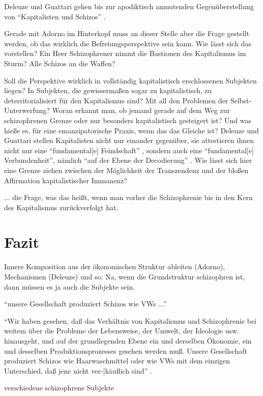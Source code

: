 \documentclass[12pt,
               DIV13,
               paper=a4,
               twoside=false,
               onehalfspacing,
               bibliography=totoc,
               toc=graduated,
               draft,
               ]{scrartcl}
\newcommand{\pc}[2]{\parencite[#1]{#2}}
\newcommand{\dg}{Deleuze und Guattari\xspace}
\begin{document}
\dg gehen bis zur apodiktisch anmutenden Gegenüberstellung von
"`Kapitalisten und Schizos"' \pc{328}{ao}.

Gerade mit Adorno im Hinterkopf muss an dieser Stelle aber die Frage
gestellt werden, ob das wirklich die Befreiungsperspektive sein kann.
Wie lässt sich das vorstellen? Ein Heer Schizophrener nimmt die
Bastionen des Kapitalismus im Sturm? Alle Schizos an die Waffen?

Soll die Perspektive wirklich in
vollständig kapitalistisch erschlossenen Subjekten liegen? In
Subjekten, die gewissermaßen sogar zu kapitalistisch, zu
deterritorialisiert für den Kapitalismus sind? Mit all den Problemen
der Selbst-Unterwerfung? Woran erkannt man, ob jemand gerade auf dem
Weg zur schizophrenen Grenze oder nur besonders kapitalistisch
gesteigert ist? Und was hieße es, für eine emanzipatorische Praxis,
wenn das das Gleiche ist? \dg stellen Kapitalisten nicht nur einander
gegenüber, sie attestieren ihnen nicht nur eine "`fundamental[e]
Feindschaft"' \pc{328}{ao}, sondern auch eine "`fundamental[e]
Verbundenheit"', nämlich "`auf der Ebene der Decodierung"'
\pc{328}{ao}. Wie lässt sich hier eine Grenze ziehen zwischen
der Möglichkeit der Transzendenz und der bloßen Affirmation
kapitalistischer Immanenz?

... die Frage, was das heißt, wenn man vorher die Schizophrenie bis in
den Kern des Kapitalismus zurückverfolgt hat.



\section{Fazit}

Innere Komposition aus der ökonomischen Struktur ableiten (Adorno),
Mechanismen (Deleuze) und so: Na, wenn die Grundstruktur schizophren
ist, dann müssen es ja auch die Subjekte sein.

"`unsere Gesellschaft produziert Schizos wie VWs ..."'

"`Wir haben gesehen, daß das Verhältnis von
Kapitalismus und Schizophrenie bei weitem über die Probleme der
Lebensweise, der Umwelt, der Ideologie usw. hinausgeht, und auf der
grundlegenden Ebene ein und derselben Ökonomie, ein und desselben
Produktionsprozesses gesehen werden muß. Unsere Gesellschaft
produziert Schizos wie Haarwaschmittel oder wie VWs mit dem einzigen
Unterschied, daß jene nicht ver-|käuflich sind"' \pc{S. 315 f.}{ao}.

verschiedene schizophrene Subjekte


\newpage
\printshorthands
\printbibliography
\end{document}
